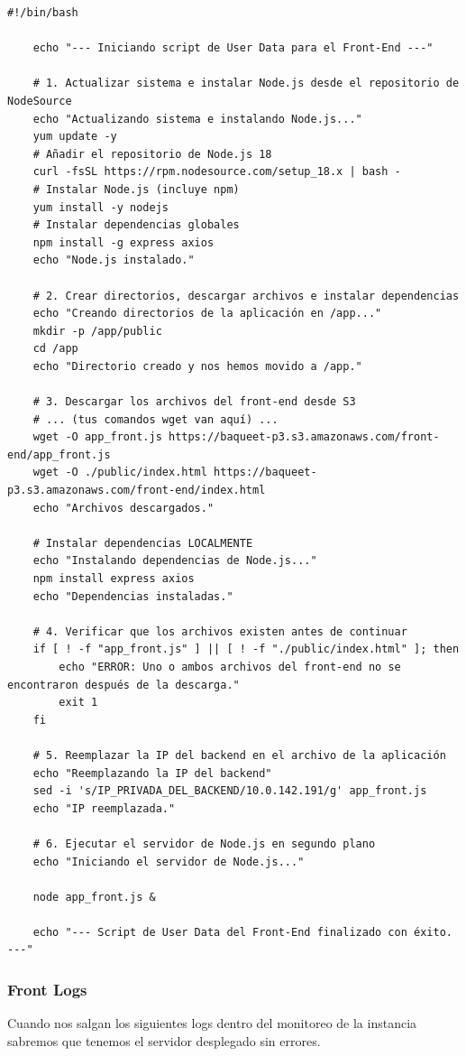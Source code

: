 \documentclass{article}
\begin{document}
	\begin{lstlisting}[style=python-style, caption= front user data sh]
	#!/bin/bash

	echo "--- Iniciando script de User Data para el Front-End ---"

	# 1. Actualizar sistema e instalar Node.js desde el repositorio de NodeSource
	echo "Actualizando sistema e instalando Node.js..."
	yum update -y
	# Añadir el repositorio de Node.js 18
	curl -fsSL https://rpm.nodesource.com/setup_18.x | bash -
	# Instalar Node.js (incluye npm)
	yum install -y nodejs
	# Instalar dependencias globales
	npm install -g express axios
	echo "Node.js instalado."

	# 2. Crear directorios, descargar archivos e instalar dependencias
	echo "Creando directorios de la aplicación en /app..."
	mkdir -p /app/public
	cd /app
	echo "Directorio creado y nos hemos movido a /app."

	# 3. Descargar los archivos del front-end desde S3
	# ... (tus comandos wget van aquí) ...
	wget -O app_front.js https://baqueet-p3.s3.amazonaws.com/front-end/app_front.js
	wget -O ./public/index.html https://baqueet-p3.s3.amazonaws.com/front-end/index.html
	echo "Archivos descargados."

	# Instalar dependencias LOCALMENTE
	echo "Instalando dependencias de Node.js..."
	npm install express axios
	echo "Dependencias instaladas."

	# 4. Verificar que los archivos existen antes de continuar
	if [ ! -f "app_front.js" ] || [ ! -f "./public/index.html" ]; then
		echo "ERROR: Uno o ambos archivos del front-end no se encontraron después de la descarga."
		exit 1
	fi

	# 5. Reemplazar la IP del backend en el archivo de la aplicación
	echo "Reemplazando la IP del backend"
	sed -i 's/IP_PRIVADA_DEL_BACKEND/10.0.142.191/g' app_front.js
	echo "IP reemplazada."

	# 6. Ejecutar el servidor de Node.js en segundo plano
	echo "Iniciando el servidor de Node.js..."

	node app_front.js &

	echo "--- Script de User Data del Front-End finalizado con éxito. ---"\end{lstlisting}
	\subsubsection{Front Logs}
	Cuando nos salgan los siguientes logs dentro del monitoreo de la instancia sabremos que tenemos el servidor desplegado sin errores.
\end{document}
